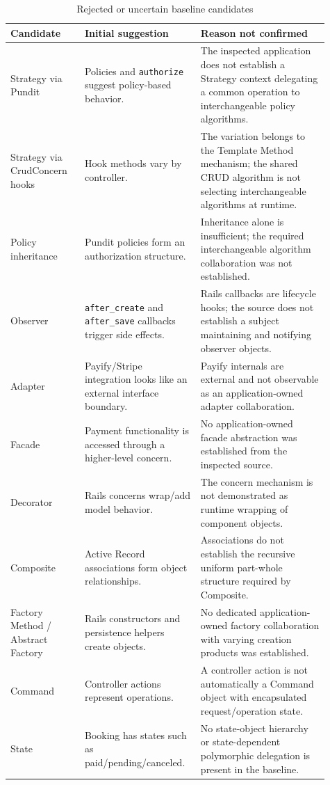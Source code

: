 \documentclass[10pt,a4paper]{article}
\newcommand{\code}[1]{\texttt{\small #1}}
\begin{document}
\begin{longtable}{p{0.22\linewidth}p{0.31\linewidth}p{0.38\linewidth}}
\caption{Rejected or uncertain baseline candidates}
\label{tab:rejected}\\
\toprule
Candidate & Initial suggestion & Reason not confirmed\\
\midrule
Strategy via Pundit & Policies and \code{authorize} suggest policy-based behavior. & The inspected application does not establish a Strategy context delegating a common operation to interchangeable policy algorithms.\\
Strategy via CrudConcern hooks & Hook methods vary by controller. & The variation belongs to the Template Method mechanism; the shared CRUD algorithm is not selecting interchangeable algorithms at runtime.\\
Policy inheritance & Pundit policies form an authorization structure. & Inheritance alone is insufficient; the required interchangeable algorithm collaboration was not established.\\
Observer & \code{after\_create} and \code{after\_save} callbacks trigger side effects. & Rails callbacks are lifecycle hooks; the source does not establish a subject maintaining and notifying observer objects.\\
Adapter & Payify/Stripe integration looks like an external interface boundary. & Payify internals are external and not observable as an application-owned adapter collaboration.\\
Facade & Payment functionality is accessed through a higher-level concern. & No application-owned facade abstraction was established from the inspected source.\\
Decorator & Rails concerns wrap/add model behavior. & The concern mechanism is not demonstrated as runtime wrapping of component objects.\\
Composite & Active Record associations form object relationships. & Associations do not establish the recursive uniform part-whole structure required by Composite.\\
Factory Method / Abstract Factory & Rails constructors and persistence helpers create objects. & No dedicated application-owned factory collaboration with varying creation products was established.\\
Command & Controller actions represent operations. & A controller action is not automatically a Command object with encapsulated request/operation state.\\
State & Booking has states such as paid/pending/canceled. & No state-object hierarchy or state-dependent polymorphic delegation is present in the baseline.\\

\end{longtable}
\end{document}
